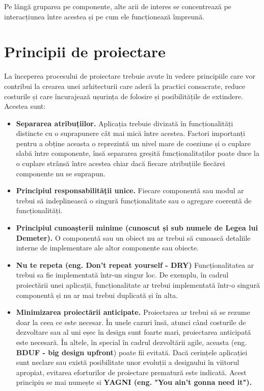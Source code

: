\documentclass[12pt, a4paper, oneside, romanian]{teza-upb}
\begin{document}
Pe lângă gruparea pe componente, alte arii de interes se concentrează pe interacțiunea între acestea și pe cum ele funcționează împreună. 
\newpage
\section{Principii de proiectare}
La începerea procesului de proiectare trebuie avute în vedere principiile care vor contribui la crearea unei arhitecturii care aderă la practici consacrate, reduce costurile și care încurajează ușurința de folosire și posibilitățile de extindere. Acestea sunt:
\begin{itemize}
\item \textbf{Separarea atribuțiilor.} Aplicația trebuie divizată în funcționalități distincte cu o suprapunere cât mai mică între acestea. Factori importanți pentru a obține aceasta o reprezintă un nivel mare de coeziune și o cuplare slabă între componente, însă separarea greșită funcționalitaților poate duce la o cuplare strânsă între acestea chiar dacă fiecare atribuțiile fiecărei componente nu se suprapun.

\item \textbf{Principiul responsabilității unice.} Fiecare componentă sau modul ar trebui să indeplinească o singură funcționalitate sau o agregare coerentă de funcționalități. 

\item \textbf{Principiul cunoașterii minime (cunoscut și sub numele de Legea lui Demeter).} O componentă sau un obiect nu ar trebui să cunoască detaliile interne de implementare ale altor componente sau obiecte.

\item \textbf{Nu te repeta (eng. Don't repeat yourself - DRY)}
Funcționalitatea ar trebui sa fie implementată într-un singur loc. De exemplu, în cadrul proiectării unei aplicații, funcționalitate ar trebui implementată într-o singură componentă și nu ar mai trebui duplicată și în alta.

\item \textbf{Minimizarea proiectării anticipate.} Proiectarea ar trebui să se rezume doar la ceea ce este necesar. În unele cazuri însă, atunci când costurile de dezvoltare sau al uni eșec în design sunt foarte mari, proiectarea anticipată este necesară. În altele, în special în cadrul dezvoltării agile, aceasta (eng. \textbf{BDUF - big design upfront}) poate fii evitată. Dacă cerințele aplicației sunt neclare sau există posibilitate unor evoluții a designului în viitorul apropiat, evitarea eforturilor de proiectare prematură este indicată. Acest principiu se mai numește si \textbf{YAGNI (eng. "You ain’t gonna need it").}
\end{itemize}
\end{document}
